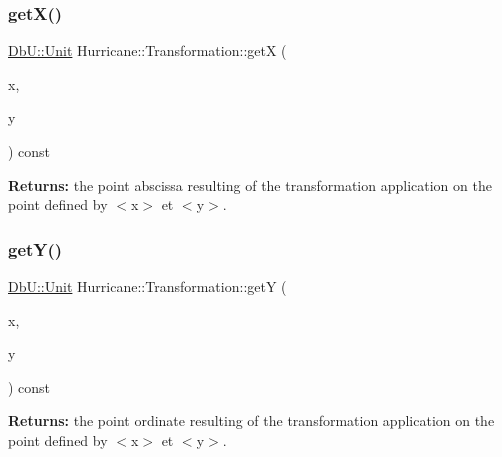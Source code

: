 \subsubsection{\texorpdfstring{get\+X()}{getX()}\hspace{0.1cm}{\footnotesize\ttfamily [1/2]}}
{\footnotesize\ttfamily \mbox{\hyperlink{group__DbUGroup_ga4fbfa3e8c89347af76c9628ea06c4146}{Db\+U\+::\+Unit}} Hurricane\+::\+Transformation\+::getX (\begin{DoxyParamCaption}\item[{const \mbox{\hyperlink{group__DbUGroup_ga4fbfa3e8c89347af76c9628ea06c4146}{Db\+U\+::\+Unit}} \&}]{x,  }\item[{const \mbox{\hyperlink{group__DbUGroup_ga4fbfa3e8c89347af76c9628ea06c4146}{Db\+U\+::\+Unit}} \&}]{y }\end{DoxyParamCaption}) const}

{\bfseries Returns\+:} the point abscissa resulting of the transformation application on the point defined by {\ttfamily $<$x$>$} et {\ttfamily $<$y$>$}. \mbox{\label{classHurricane_1_1Transformation_a8ad883a70823c00772293549b6e611e7}} 
\subsubsection{\texorpdfstring{get\+Y()}{getY()}\hspace{0.1cm}{\footnotesize\ttfamily [1/2]}}
{\footnotesize\ttfamily \mbox{\hyperlink{group__DbUGroup_ga4fbfa3e8c89347af76c9628ea06c4146}{Db\+U\+::\+Unit}} Hurricane\+::\+Transformation\+::getY (\begin{DoxyParamCaption}\item[{const \mbox{\hyperlink{group__DbUGroup_ga4fbfa3e8c89347af76c9628ea06c4146}{Db\+U\+::\+Unit}} \&}]{x,  }\item[{const \mbox{\hyperlink{group__DbUGroup_ga4fbfa3e8c89347af76c9628ea06c4146}{Db\+U\+::\+Unit}} \&}]{y }\end{DoxyParamCaption}) const}

{\bfseries Returns\+:} the point ordinate resulting of the transformation application on the point defined by {\ttfamily $<$x$>$} et {\ttfamily $<$y$>$}. \mbox{\label{classHurricane_1_1Transformation_adcd79ae74399431387d246dce68b8d70}} 
